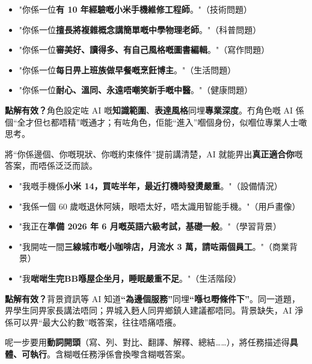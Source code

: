 
\begin{itemize}
  \item "你係一位\textbf{有 10 年經驗嘅小米手機維修工程師}。"（技術問題）
  \item "你係一位\textbf{擅長將複雜概念講簡單嘅中學物理老師}。"（科普問題）
  \item "你係一位\textbf{審美好、讀得多、有自己風格嘅圖書編輯}。"（寫作問題）
  \item "你係一位\textbf{每日畀上班族做早餐嘅烹飪博主}。"（生活問題）
  \item "你係一位\textbf{耐心、溫同、永遠唔嘲笑新手嘅中醫}。"（健康問題）
\end{itemize}

\textbf{點解有效？}角色設定咗 AI 嘅\textbf{知識範圍}、\textbf{表達風格}同埋\textbf{專業深度}。冇角色嘅 AI 係個“全才但乜都唔精”嘅通才；有咗角色，佢能“進入”嗰個身份，似嗰位專業人士噉思考。


將“你係邊個、你嘅現狀、你嘅約束條件”提前講清楚，AI 就能畀出\textbf{真正適合你}嘅答案，而唔係泛泛而談。


\begin{itemize}
  \item "我嘅手機係\textbf{小米 14，買咗半年，最近打機時發燙嚴重}。"（設備情況）
  \item "我係一個 60 歲嘅退休阿姨，眼唔太好，唔太識用智能手機。"（用戶畫像）
  \item "我正在\textbf{準備 2026 年 6 月嘅英語六級考試，基礎一般}。"（學習背景）
  \item "我開咗一間\textbf{三線城市嘅小咖啡店，月流水 3 萬，請咗兩個員工}。"（商業背景）
  \item "我\textbf{啱啱生完BB喺屋企坐月，睡眠嚴重不足}。"（生活階段）
\end{itemize}

\textbf{點解有效？}背景資訊等 AI 知道\textbf{“為邊個服務”}同埋\textbf{“喺乜嘢條件下”}。同一道題，畀學生同畀家長講法唔同；畀城入麪人同畀鄉鎮人建議都唔同。背景缺失，AI 淨係可以畀“最大公約數”嘅答案，往往唔痛唔癢。


呢一步要用\textbf{動詞開頭}（寫、列、對比、翻譯、解釋、總結……），將任務描述得\textbf{具體、可執行}。含糊嘅任務淨係會換嚟含糊嘅答案。


